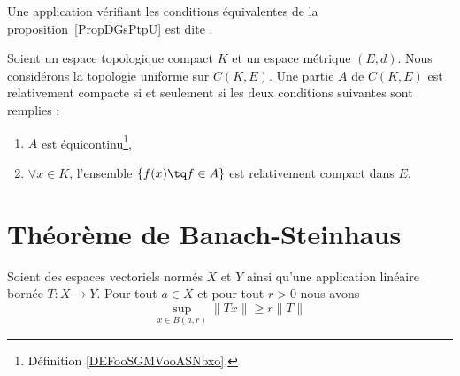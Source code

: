 \begin{definition}
    Une application vérifiant les conditions équivalentes de la proposition~\ref{PropDGsPtpU} est dite .
\end{definition}

\begin{theorem}        \label{ThoKRbtpah}
    Soient un espace topologique compact \( K\) et un espace métrique \( (E,d)\). Nous considérons la topologie uniforme sur \( C(K,E)\). Une partie \( A\) de \( C(K,E)\) est relativement compacte si et seulement si les deux conditions suivantes sont remplies :
    \begin{enumerate}
        \item
            \( A\) est équicontinu\footnote{Définition \ref{DEFooSGMVooASNbxo}.},
        \item
            \( \forall x\in K\), l'ensemble \( \{ f(x)\tq f\in A \}\) est relativement compact dans \( E\).
    \end{enumerate}
\end{theorem}

\section{Théorème de Banach-Steinhaus}

\begin{lemma}     \label{LEMooPIPLooMppGSO}
    Soient des espaces vectoriels normés \( X\) et \( Y\) ainsi qu'une application linéaire bornée \( T\colon X\to Y\). Pour tout \( a\in X\) et pour tout \( r>0\) nous avons
    \begin{equation}
        \sup_{x\in B(a,r)}\| Tx \|\geq r\| T \|
    \end{equation}
\end{lemma}

